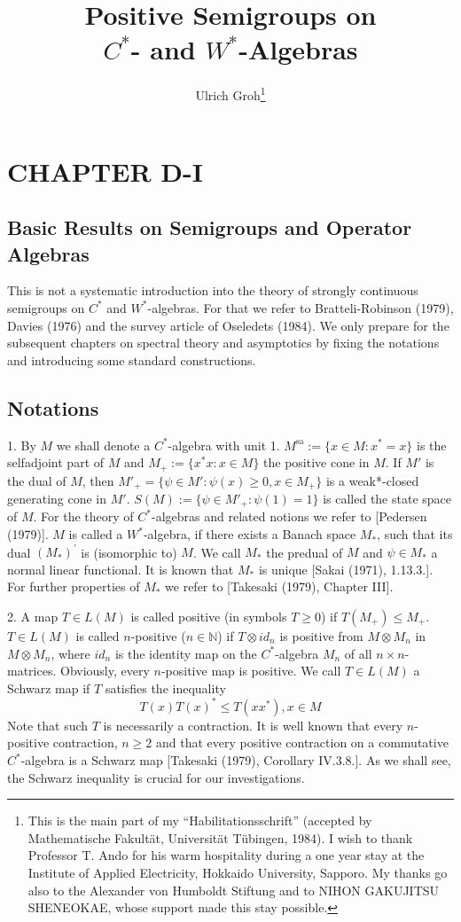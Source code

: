 \documentclass[a4paper, fontsize=11pt, oneside]{scrbook}
\title{Positive Semigroups on \\ $C^{*}$- and $W^{*}$-Algebras}
\author{Ulrich Groh\thanks{This is the main part of my  \enquote{Habilitationsschrift} (accepted by Mathematische Fakultät, Universität Tübingen, 1984).
I wish to thank Professor T. Ando for his warm hospitality during a one year stay at the Institute of Applied Electricity, Hokkaido University, Sapporo.
My thanks go also to the Alexander von Humboldt Stiftung and to NIHON GAKUJITSU SHENEOKAE, whose support made this stay possible.}}
\begin{document}
\maketitle
\setcounter{chapter}{1}
\chapter*{CHAPTER D-I}

\section*{Basic Results on Semigroups and Operator Algebras}

This is not a systematic introduction into the theory of strongly continuous semigroups on $C^{*}$ and $W^{*}$-algebras.
For that we refer to Bratteli-Robinson (1979), Davies (1976) and the survey article of Oseledets (1984).
We only prepare for the subsequent chapters on spectral theory and asymptotics by fixing the notations and introducing some standard constructions.

\section{Notations}

1. By $M$ we shall denote a $C^{*}$-algebra with unit 1.
$M^{\text{sa}} := \{x \in M : x^{*} = x\}$ is the selfadjoint part of $M$ and $M_{+} := \{x^{*} x : x \in M\}$ the positive cone in $M$.
If $M'$ is the dual of $M$, then $M'_{+} = \{\psi \in M' : \psi(x) \geq 0, x \in M_{+}\}$ is a weak*-closed generating cone in $M'$.
$S(M) := \{\psi \in M'_{+} : \psi(1) = 1\}$ is called the state space of $M$.
For the theory of $C^{*}$-algebras and related notions we refer to [Pedersen (1979)].
$M$ is called a $W^{*}$-algebra, if there exists a Banach space $M_{*}$, such that its dual $(M_{*})^{'}$ is (isomorphic to) $M$.
We call $M_{*}$ the predual of $M$ and $\psi \in M_{*}$ a normal linear functional.
It is known that $M_{*}$ is unique [Sakai (1971), 1.13.3.].
For further properties of $M_{*}$ we refer to [Takesaki (1979), Chapter III].

2. A map $T \in L(M)$ is called positive (in symbols $T \geq 0$) if $T(M_{+}) \leq M_{+}$.
$T \in L(M)$ is called $n$-positive ($n \in \mathbb{N}$) if $T \otimes id_n$ is positive from $M \otimes M_n$ in $M \otimes M_n$, where $id_n$ is the identity map on the $C^{*}$-algebra $M_n$ of all $n \times n$-matrices.
Obviously, every $n$-positive map is positive.
We call $T \in L(M)$ a Schwarz map if $T$ satisfies the inequality
\[
T(x)T(x)^{*} \leq T(xx^{*}), x \in M
\]
Note that such $T$ is necessarily a contraction.
It is well known that every $n$-positive contraction, $n \geq 2$ and that every positive contraction on a commutative $C^{*}$-algebra is a Schwarz map [Takesaki (1979), Corollary IV.3.8.].
As we shall see, the Schwarz inequality is crucial for our investigations.
\end{document}
